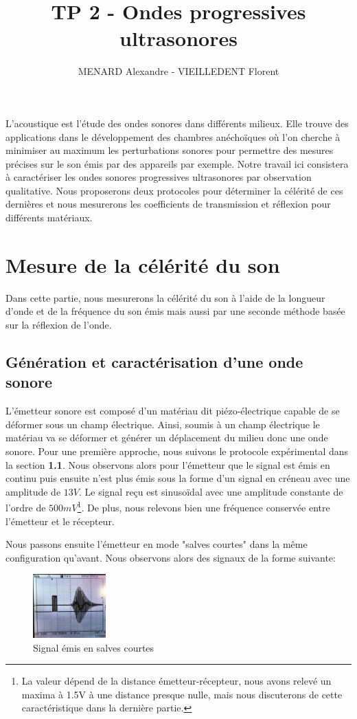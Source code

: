 \documentclass[12pt]{article}
\title{\vspace{-2cm}\textbf{TP 2 - Ondes progressives ultrasonores}}
\author{\vspace{-0.5cm}MENARD Alexandre - VIEILLEDENT Florent}
\date{\vspace{-0.7cm}}
\begin{document}
\maketitle

L'acoustique est l'étude des ondes sonores dans différents milieux. Elle trouve des applications dans le développement des chambres
anéchoïques où l'on cherche à minimiser au maximum les perturbations sonores pour permettre des mesures précises sur le son émis par des appareils par exemple. 
Notre travail ici consistera à caractériser les ondes sonores progressives ultrasonores par observation qualitative. Nous proposerons
deux protocoles pour déterminer la célérité de ces dernières et nous mesurerons les coefficients de transmission et réflexion pour différents matériaux.

\section{Mesure de la célérité du son}
Dans cette partie, nous mesurerons la célérité du son à l'aide de la longueur d'onde et de la fréquence du son émis mais aussi par une seconde méthode basée sur la réflexion de l'onde.

\subsection{Génération et caractérisation d'une onde sonore}
L'émetteur sonore est composé d'un matériau dit piézo-électrique capable de se déformer sous un champ électrique. Ainsi, soumis à un champ électrique
le matériau va se déformer et générer un déplacement du milieu donc une onde sonore. Pour une première approche, nous suivons le protocole
expérimental dans la section \textbf{1.1}. Nous observons alors pour l'émetteur que le signal est émis en continu puis ensuite n'est plus émis sous la forme d'un signal en créneau avec une amplitude de $13V$.
Le signal reçu est sinusoïdal avec une amplitude constante de l'ordre de $500mV$\footnote{La valeur dépend de la distance émetteur-récepteur, nous avons relevé un maxima à 1.5V à une distance presque nulle, mais nous discuterons de cette caractéristique dans la dernière partie.}. De plus, nous relevons
bien une fréquence conservée entre l'émetteur et le récepteur.

Nous passons ensuite l'émetteur en mode "salves courtes" dans la même configuration qu'avant. Nous observons alors des signaux de la forme suivante:
\begin{figure}[!htbp]
	\centering
	\includegraphics[width=0.25\textwidth]{img/salves_courtes.jpg}
	\hfill
	\caption{Signal émis en salves courtes}
\end{figure}
\end{document}
